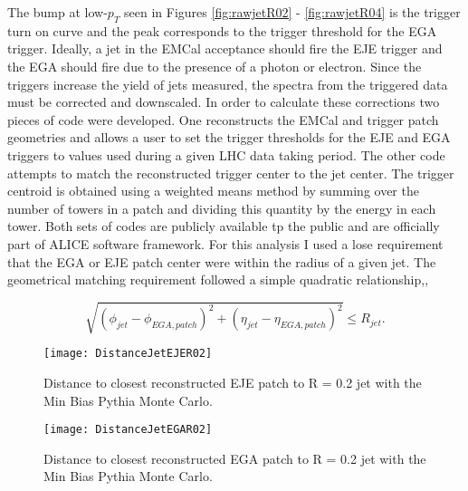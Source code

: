 The bump at low-$p_{T}$ seen in Figures \ref{fig:rawjetR02} - \ref{fig:rawjetR04} is the trigger turn on curve and the peak corresponds to the trigger threshold for the EGA trigger.  Ideally, a jet in the EMCal acceptance should fire the EJE trigger and the EGA should fire due to the presence of a photon or electron.  Since the triggers increase the yield of jets measured, the spectra from the triggered data must be corrected and downscaled.  In order to calculate these corrections two pieces of code were developed.  One reconstructs the EMCal and trigger patch geometries and allows a user to set the trigger thresholds for the EJE and EGA triggers to values used during a given LHC data taking period.  The other code attempts to match the reconstructed trigger center to the jet center.  The trigger centroid is obtained using a weighted means method by summing over the number of towers in a patch and dividing this quantity by the energy in each tower.  Both sets of codes are publicly available tp the public and are officially part of ALICE software framework.  For this analysis I used a lose requirement that the EGA or EJE patch center were within the radius of a given jet.  The geometrical matching requirement followed a simple quadratic relationship,,

\begin{equation}
\sqrt{ ( \phi_{jet} - \phi_{EGA, patch} )^{2} + ( \eta_{jet} - \eta_{EGA, patch} )^{2}}  \leq R_{jet} .
\label{eq:triggermatch}
\end{equation}

\begin{figure}[h]
\texttt{[image: DistanceJetEJER02]}
\centering
\caption{Distance to closest reconstructed EJE patch to R = 0.2 jet with the Min Bias Pythia Monte Carlo.}
\label{fig:DisJetEJE}
\end{figure}

\begin{figure}[h]
\texttt{[image: DistanceJetEGAR02]}
\centering
\caption{Distance to closest reconstructed EGA patch to R = 0.2 jet with the Min Bias Pythia Monte Carlo.}
\label{fig:DisJetEGA}
\end{figure}

